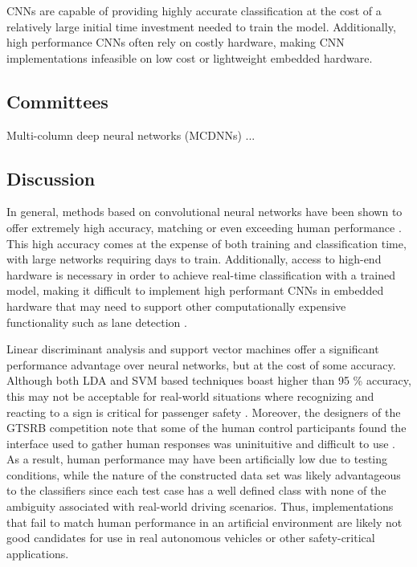 \documentclass[letterpaper,twocolumn,10pt]{article}
\begin{document}
CNNs are capable of providing highly accurate classification at the cost of a relatively large initial time investment needed to train the model. Additionally, high performance CNNs often rely on costly hardware, making CNN implementations infeasible on low cost or lightweight embedded hardware.

\subsection{Committees}

Multi-column deep neural networks (MCDNNs) ...


\subsection{Discussion}

In general, methods based on convolutional neural networks have been shown to offer extremely high accuracy, matching or even exceeding human performance \cite{ciresan_committee_2011, ciresan_multi-column_2012, sermanet_convolutional_2012, sermanet_traffic_2011}. This high accuracy comes at the expense of both training and classification time, with large networks requiring days to train. Additionally, access to high-end hardware is necessary in order to achieve real-time classification with a trained model, making it difficult to implement high performant CNNs in embedded hardware that may need to support other computationally expensive functionality such as lane detection \cite{ciresan_committee_2011, ciresan_multi-column_2012, lane-detection}.

Linear discriminant analysis and support vector machines offer a significant performance advantage over neural networks, but at the cost of some accuracy. Although both LDA and SVM based techniques boast higher than 95 \% accuracy, this may not be acceptable for real-world situations where recognizing and reacting to a sign is critical for passenger safety \cite{}. Moreover, the designers of the GTSRB competition note that some of the human control participants found the interface used to gather human responses was uninituitive and difficult to use \cite{stallkamp_german_2011, stallkamp_man_2012}. As a result, human performance may have been artificially low due to testing conditions, while the nature of the constructed data set was likely advantageous to the classifiers since each test case has a well defined class with none of the ambiguity associated with real-world driving scenarios. Thus, implementations that fail to match human performance in an artificial environment are likely not good candidates for use in real autonomous vehicles or other safety-critical applications.
\end{document}
